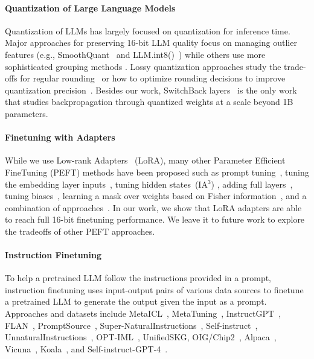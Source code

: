 \documentclass{article}
\begin{document}
\paragraph{Quantization of Large Language Models} Quantization of LLMs has largely focused on quantization for inference time. 
Major approaches for preserving 16-bit LLM quality focus on managing outlier features (e.g., SmoothQuant~\citep{xiao2022smoothquant} and LLM.int8()~\citep{dettmers2022llm}) while others use more sophisticated grouping methods \citep{park2022nuqmm, yao2022zeroquant}. Lossy quantization approaches study the trade-offs for regular rounding~\citep{dettmers2022case,zeng2022glm,pope2022efficiently} or how to optimize rounding decisions to improve quantization precision~\citep{frantar2022gptq}. Besides our work, SwitchBack layers~\citep{wortsman2023stable} is the only work that studies backpropagation through quantized weights at a scale beyond 1B parameters.

\paragraph{Finetuning with Adapters} While we use Low-rank Adapters~\citep{hu2021lora} (LoRA), many other Parameter Efficient FineTuning (PEFT) methods have been proposed such as prompt tuning~\citep{qin2021learning,lester2021power,li2021prefix}, tuning the embedding layer inputs~\citep{an2022input}, tuning hidden states~(IA$^3$) \citep{liu2022few}, adding full layers~\citep{houlsby2019parameter}, tuning biases~\citep{zaken2021bitfit}, learning a mask over weights based on Fisher information~\citep{sung2021training}, and a combination of approaches~\citep{henderson2021compacter}. In our work, we show that LoRA adapters are able to reach full 16-bit finetuning performance. We leave it to future work to explore the tradeoffs of other PEFT approaches.

\paragraph{Instruction Finetuning} To help a pretrained LLM follow the instructions provided in a prompt, instruction finetuning uses input-output pairs of various data sources to finetune a pretrained LLM to generate the output given the input as a prompt. Approaches and datasets include MetaICL~\citep{min2021metaicl}, MetaTuning~\citep{zhong2021adapting}, InstructGPT~\citep{ouyang2022training}, FLAN~\citep{wei2021finetuned,chung2022scaling}, PromptSource~\citep{bach2022promptsource}, Super-NaturalInstructions~\citep{wang2022super,sanh2021multitask}, Self-instruct~\citep{wang2022self}, UnnaturalInstructions~\citep{honovich2022unnatural}, OPT-IML~\citep{iyer2022opt}, UnifiedSKG\citep{xie2022unifiedskg}, OIG/Chip2~\citep{laion2023}, Alpaca~\citep{alpaca}, Vicuna~\citep{vicuna2023}, Koala~\citep{koala_blogpost_2023}, and Self-instruct-GPT-4~\citep{peng2023instruction}.
\end{document}
